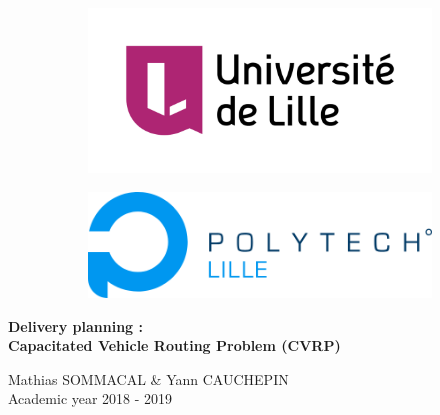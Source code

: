 \begin{titlepage}

	\begin{figure}[t]
		\begin{subfigure}[h]{0.5\linewidth}
			
			\begin{flushleft}
				\includegraphics[scale=0.2]{media/universite_lille.png}
			\end{flushleft}
		\end{subfigure}
		\begin{subfigure}[h]{0.5\linewidth}
			\begin{flushright}
				\includegraphics[scale=0.25]{media/polytech_lille.png}
			\end{flushright}
		\end{subfigure}

	\end{figure}

	\centering 

	\huge
	\vspace*{4cm}
	\textbf{Delivery planning :\\
Capacitated Vehicle Routing Problem (CVRP)}

	\Large

	\vspace{6cm}
	Mathias SOMMACAL \& Yann CAUCHEPIN\\

	\vspace{1cm}
	Academic year 2018 - 2019\\


\end{titlepage}